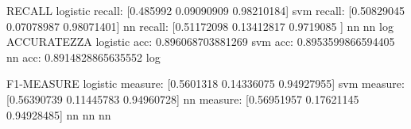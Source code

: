 		RECALL
		logistic recall: [0.485992   0.09090909 0.98210184]
		svm		 recall: [0.50829045 0.07078987 0.98071401]
		nn		 recall: [0.51172098 0.13412817 0.9719085 ]
							nn 	    	nn		     log
		ACCURATEZZA
		logistic acc: 0.896068703881269
		svm		 acc: 0.8953599866594405
		nn		 acc: 0.8914828865635552
							log			
							
		F1-MEASURE
		logistic measure: [0.5601318  0.14336075 0.94927955]
		svm		 measure: [0.56390739 0.11445783 0.94960728]
		nn		 measure: [0.56951957 0.17621145 0.94928485]
								nn			nn			nn
							
							
